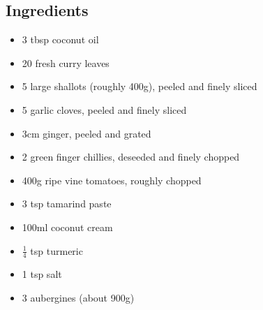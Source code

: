 \documentclass{book}
\begin{document}
\subsection*{Ingredients}
\begin{itemize}
\item 3 tbsp coconut oil
\item 20 fresh curry leaves
\item 5 large shallots (roughly 400g), peeled and finely sliced
\item 5 garlic cloves, peeled and finely sliced
\item 3cm ginger, peeled and grated
\item 2 green finger chillies, deseeded and finely chopped
\item 400g ripe vine tomatoes, roughly chopped
\item 3 tsp tamarind paste
\item 100ml coconut cream
\item $\frac{1}{4}$ tsp turmeric
\item 1 tsp salt
\item 3 aubergines (about 900g)
\end{itemize}
\end{document}
